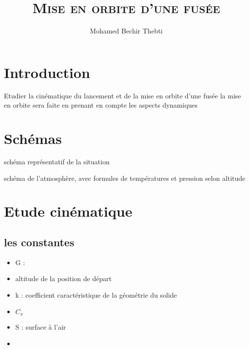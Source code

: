 \documentclass[12pt,a4paper]{article}
\title{
	\Huge\textsc{Mise en orbite d'une fusée}
}
\author{Mohamed Bechir Thebti}
\begin{document}
\setlength{\parindent}{0mm}

\fancyhead[R]{\slshape \leftmark}

\fancyfoot[C]{}
\fancyfoot[R]{\thepage}

\maketitle
\newpage

\tableofcontents

\newpage



\section{Introduction}

Etudier la cinématique du lancement et de la mise en orbite d'une fusée
\medbreak
la mise en orbite sera faite en prenant en compte les aspects dynamiques


\newpage
\section{Schémas}
schéma représentatif de la situation

schéma de l'atmosphère, avec formules de températures et pression selon altitude

\section{Etude cinématique}


\subsection{les constantes}

\begin{itemize}
	\item G : 
	\item altitude de la position de départ
	\item k : coefficient caractéristique de la géométrie du solide
	\item $C_x$
	\item S : surface à l'air
	\item 
\end{itemize}
\end{document}
